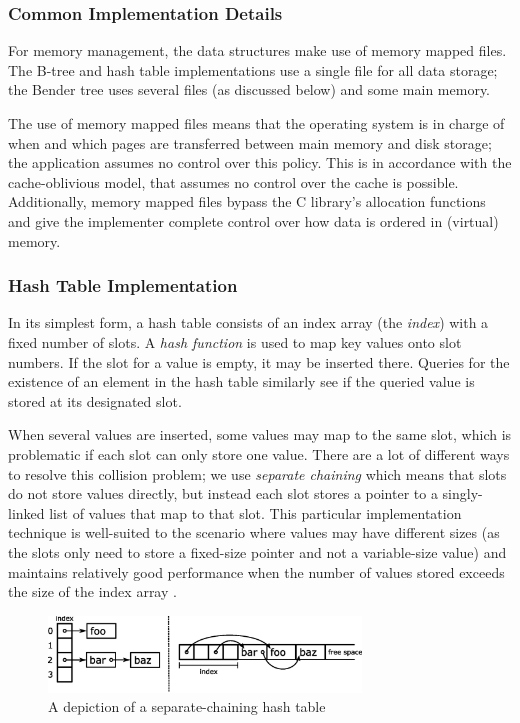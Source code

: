 \documentclass{acm_proc_article-sp}
\begin{document}
\subsubsection{Common Implementation Details}
For memory management, the data structures make use of memory mapped files.
The B-tree and hash table implementations use a single file for all data storage;
the Bender tree uses several files (as discussed below) and some main memory.

The use of memory mapped files means that the operating system is in charge of
when and which pages are transferred between main memory and disk storage; the
application assumes no control over this policy. This is in accordance with the
cache-oblivious model, that assumes no control over the cache is possible.
Additionally, memory mapped files bypass the C library's allocation functions
and give the implementer complete control over how data is ordered in (virtual)
memory.

\subsubsection{Hash Table Implementation}
In its simplest form, a hash table consists of an
index array (the \emph{index}) with a fixed number of slots. A \emph{hash
function} is used to map key values onto slot numbers. If the slot for a value
is empty, it may be inserted there. Queries for the existence of an element in
the hash table similarly see if the queried value is stored at its designated
slot.

When several values are inserted, some values may map to the same slot,
which is problematic if each slot can only store one value. There
are a lot of different ways to resolve this collision problem; we use
\emph{separate chaining} which means that slots do not store values directly,
but instead each slot stores a pointer to a singly-linked list of values that
map to that slot. This particular implementation technique is well-suited to
the scenario where values may have different sizes (as the slots only need to
store a fixed-size pointer and not a variable-size value) and maintains
relatively good performance when the number of values stored exceeds the size
of the index array \cite{sedgewick1998ac}.

\begin{figure}
\centering
\includegraphics[width=83mm]{hash-table}
\caption{A depiction of a separate-chaining hash table}
\label{fig-hash-table}
\end{figure}
\end{document}
